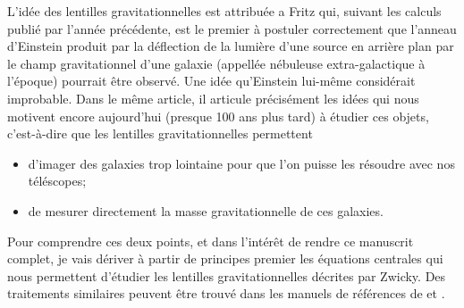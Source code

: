 

L'idée des lentilles gravitationnelles est attribuée a Fritz \citet{Zwicky1937} %
qui, suivant les calculs publié par \citet{Einstein1936} l'année précédente, %
est le premier à postuler correctement que l'anneau d'Einstein produit par la déflection 
de la lumière d'une source en arrière plan par le champ gravitationnel d'une galaxie 
(appellée nébuleuse extra-galactique à l'époque) 
pourrait être observé. Une idée qu'Einstein lui-même considérait improbable. 
Dans le même article, il articule précisément les idées qui nous motivent encore aujourd'hui 
(presque 100 ans plus tard) à étudier ces objets, 
c'est-à-dire que les lentilles gravitationnelles permettent
\begin{itemize}
        \item d'imager des galaxies trop lointaine pour que l'on puisse les résoudre avec 
                nos téléscopes;
        \item de mesurer directement la masse gravitationnelle de ces galaxies.
\end{itemize}
Pour comprendre ces deux points, 
et dans l'intérêt de rendre ce manuscrit complet, je vais dériver à partir de principes 
premier les équations 
centrales qui nous permettent d'étudier les lentilles gravitationnelles décrites par 
Zwicky.
Des traitements similaires 
peuvent être trouvé dans les manuels de références de \citet{Meneghetti2013} et 
\citet{Carroll2003}.

